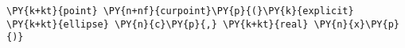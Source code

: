 \begin{Verbatim}[commandchars=\\\{\}]
    \PY{k+kt}{point} \PY{n+nf}{curpoint}\PY{p}{(}\PY{k}{explicit} \PY{k+kt}{ellipse} \PY{n}{c}\PY{p}{,} \PY{k+kt}{real} \PY{n}{x}\PY{p}{)}
\end{Verbatim}

